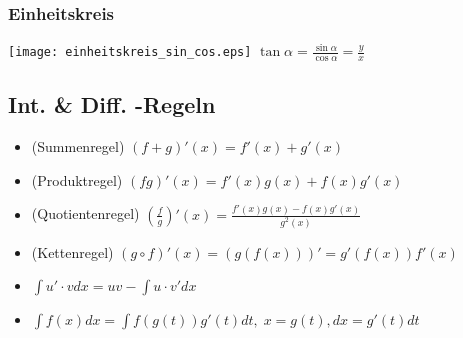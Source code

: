 \subsubsection{Einheitskreis}
\texttt{[image: einheitskreis\_sin\_cos.eps]}
$\tan \alpha = \frac{\sin \alpha}{\cos \alpha} = \frac{y}{x}$


\subsection{Int. \& Diff. -Regeln}
\begin{itemize}[leftmargin=*]
	\item (Summenregel) $(f + g)'(x) = f'(x) + g'(x)$
	\item (Produktregel) $(fg)'(x) = f'(x)g(x) + f(x)g'(x)$
	\item (Quotientenregel) $(\frac{f}{g})'(x) = \frac{f'(x)g(x) -
	f(x)g'(x)}{g^2(x)}$
	\item (Kettenregel) $(g \circ f)'(x) = (g(f(x)))' = g'(f(x)) f'(x)$
	\item $\int u'\cdot v dx = uv - \int u \cdot v' dx$
	\item $\int f(x) dx = \int f(g(t)) g'(t) dt, \; x=g(t), dx = g'(t) dt$
\end{itemize}

